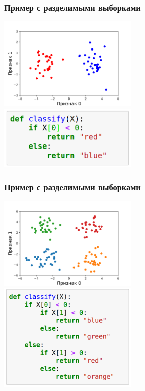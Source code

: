 \documentclass[14pt]{beamer}
\begin{document}
\begin{frame}
\frametitle{Пример с разделимыми выборками}

    \includegraphics[width=0.5\textwidth]{tree_one_feature_separable.png}   
    \pause
    \includegraphics[width=0.5\textwidth]{tree_one_feature_separable_classifier.png}   

\end{frame}

\begin{frame}
\frametitle{Пример с разделимыми выборками}

    \includegraphics[width=0.5\textwidth]{tree_two_features_separable.png}
    \pause
    \includegraphics[width=0.5\textwidth]{tree_two_features_separable_classifier.png}   

\end{frame}
\end{document}
